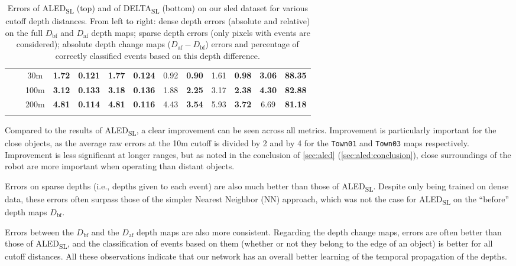 \begin{table}[ht]
{\begin{tabular}{@{}clccccccccccc@{}}
      & & 30m & \textbf{1.72} & \textbf{0.121} & \textbf{1.77} & \textbf{0.124} & 0.92 & \textbf{0.90} & 1.61 & \textbf{0.98} & \textbf{3.06} & \textbf{88.35} \\
      & & 100m & \textbf{3.12} & \textbf{0.133} & \textbf{3.18} & \textbf{0.136} & 1.88 & \textbf{2.25} & 3.17 & \textbf{2.38} & \textbf{4.30} & \textbf{82.88} \\
      & & 200m & \textbf{4.81} & \textbf{0.114} & \textbf{4.81} & \textbf{0.116} & 4.43 & \textbf{3.54} & 5.93 & \textbf{3.72} & 6.69 & \textbf{81.18} \\
      \cmidrule[\heavyrulewidth]{2-13}
      \addlinespace[-\belowrulesep]
    \end{tabular}
  }
  \caption{Errors of ALED\textsubscript{SL} (top) and of DELTA\textsubscript{SL} (bottom) on our \acrshort{sled} dataset for various cutoff depth distances. From left to right: dense depth errors (absolute and relative) on the full \(D_\text{bf}\) and \(D_\text{af}\) depth maps; sparse depth errors (only pixels with events are considered); absolute depth change maps (\(D_\text{af}-D_\text{bf}\)) errors and percentage of correctly classified events based on this depth difference.}\label{tab:delta:results_sled}
\end{table}

Compared to the results of ALED\textsubscript{SL}, a clear improvement can be seen across all metrics. Improvement is particularly important for the close objects, as the average raw errors at the 10m cutoff is divided by 2 and by 4 for the \verb|Town01| and \verb|Town03| maps respectively. Improvement is less significant at longer ranges, but as noted in the conclusion of \cref{sec:aled} (\cref{sec:aled:conclusion}), close surroundings of the robot are more important when operating than distant objects.

Errors on sparse depths (i.e., depths given to each event) are also much better than those of ALED\textsubscript{SL}. Despite only being trained on dense data, these errors often surpass those of the simpler Nearest Neighbor (NN) approach, which was not the case for ALED\textsubscript{SL} on the ``before'' depth maps \(D_\text{bf}\).

Errors between the \(D_\text{bf}\) and the \(D_\text{af}\) depth maps are also more consistent. Regarding the depth change maps, errors are often better than those of ALED\textsubscript{SL}, and the classification of events based on them (whether or not they belong to the edge of an object) is better for all cutoff distances. All these observations indicate that our network has an overall better learning of the temporal propagation of the depths.

